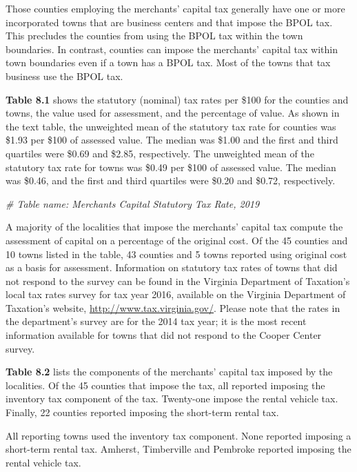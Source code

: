 \documentclass[
]{book}
\newenvironment{Shaded}{\begin{snugshade}}{\end{snugshade}}
\newcommand{\CommentTok}[1]{\textcolor[rgb]{0.56,0.35,0.01}{\textit{#1}}}
\begin{document}
Those counties employing the merchants' capital tax generally have one or more incorporated towns that are business centers and that impose the BPOL tax. This precludes the counties from using the BPOL tax within the town boundaries. In contrast, counties can impose the merchants' capital tax within town boundaries even if a town has a BPOL tax. Most of the towns that tax business use the BPOL tax.

\textbf{Table 8.1} shows the statutory (nominal) tax rates per \$100 for the counties and towns, the value used for assessment, and the percentage of value. As shown in the text table, the unweighted mean of the statutory tax rate for counties was \$1.93 per \$100 of assessed value. The median was \$1.00 and the first and third quartiles were \$0.69 and \$2.85, respectively. The unweighted mean of the statutory tax rate for towns was \$0.49 per \$100 of assessed value. The median was \$0.46, and the first and third quartiles were \$0.20 and \$0.72, respectively.

\begin{Shaded}
\begin{Highlighting}[]
\CommentTok{\# Table name: Merchants\textquotesingle{} Capital Statutory Tax Rate, 2019}
\end{Highlighting}
\end{Shaded}

A majority of the localities that impose the merchants' capital tax compute the assessment of capital on a percentage of the original cost. Of the 45 counties and 10 towns listed in the table, 43 counties and 5 towns reported using original cost as a basis for assessment. Information on statutory tax rates of towns that did not respond to the survey can be found in the Virginia Department of Taxation's local tax rates survey for tax year 2016, available on the Virginia Department of Taxation's website, \url{http://www.tax.virginia.gov/}. Please note that the rates in the department's survey are for the 2014 tax year; it is the most recent information available for towns that did not respond to the Cooper Center survey.

\textbf{Table 8.2} lists the components of the merchants' capital tax imposed by the localities. Of the 45 counties that impose the tax, all reported imposing the inventory tax component of the tax. Twenty-one impose the rental vehicle tax. Finally, 22 counties reported imposing the short-term rental tax.

All reporting towns used the inventory tax component. None reported imposing a short-term rental tax. Amherst, Timberville and Pembroke reported imposing the rental vehicle tax.
\end{document}
